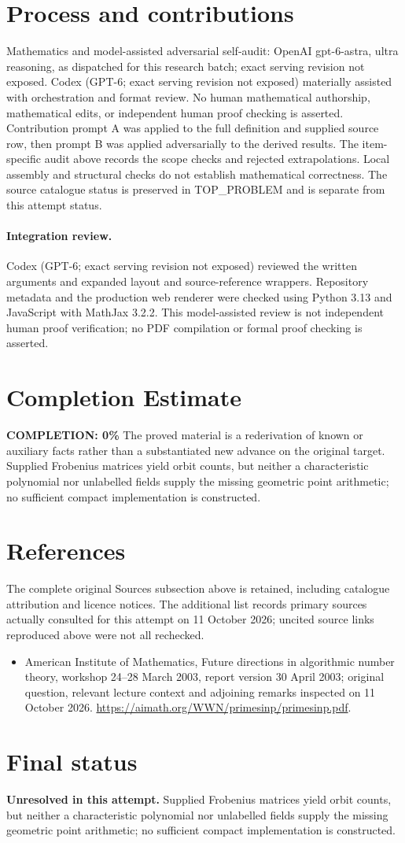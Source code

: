 \documentclass[11pt]{article}
\begin{document}
\section{Process and contributions}
Mathematics and model-assisted adversarial self-audit: OpenAI gpt-6-astra, ultra reasoning, as dispatched for this research batch; exact serving revision not exposed. Codex (GPT-6; exact serving revision not exposed) materially assisted with orchestration and format review. No human mathematical authorship, mathematical edits, or independent human proof checking is asserted.
Contribution prompt A was applied to the full definition and supplied source row, then prompt B was applied adversarially to the derived results. The item-specific audit above records the scope checks and rejected extrapolations. Local assembly and structural checks do not establish mathematical correctness. The source catalogue status is preserved in TOP\_PROBLEM and is separate from this attempt status.
\paragraph{Integration review.} Codex (GPT-6; exact serving revision not exposed) reviewed the written arguments and expanded layout and source-reference wrappers. Repository metadata and the production web renderer were checked using Python 3.13 and JavaScript with MathJax 3.2.2. This model-assisted review is not independent human proof verification; no PDF compilation or formal proof checking is asserted.

\section{Completion Estimate}
\noindent\textbf{COMPLETION: 0\%}
The proved material is a rederivation of known or auxiliary facts rather than a substantiated new advance on the original target. Supplied Frobenius matrices yield orbit counts, but neither a characteristic polynomial nor unlabelled fields supply the missing geometric point arithmetic; no sufficient compact implementation is constructed.
\section{References}
The complete original Sources subsection above is retained, including catalogue attribution and licence notices. The additional list records primary sources actually consulted for this attempt on 11 October 2026; uncited source links reproduced above were not all rechecked.
\begin{itemize}
\item American Institute of Mathematics, Future directions in algorithmic number theory, workshop 24--28 March 2003, report version 30 April 2003; original question, relevant lecture context and adjoining remarks inspected on 11 October 2026. \url{https://aimath.org/WWN/primesinp/primesinp.pdf}.
\end{itemize}
\section{Final status}
\textbf{Unresolved in this attempt.} Supplied Frobenius matrices yield orbit counts, but neither a characteristic polynomial nor unlabelled fields supply the missing geometric point arithmetic; no sufficient compact implementation is constructed.
\end{document}
